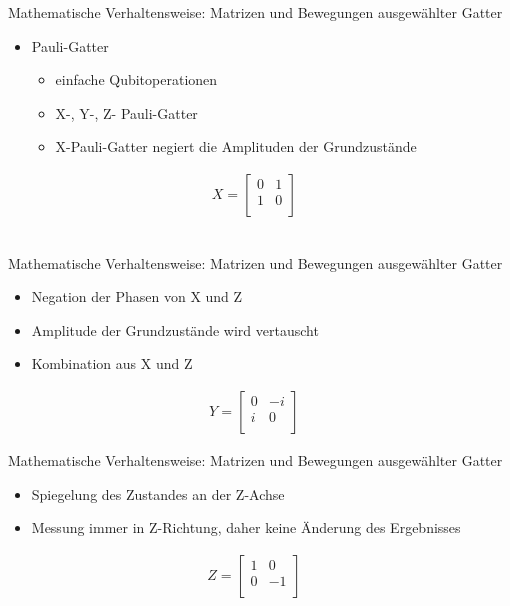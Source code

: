 \documentclass[]{beamer}
\begin{document}
\begin{frame}{Mathematische Verhaltensweise: Matrizen und Bewegungen ausgewählter Gatter}
\begin{center}%
	\begin{itemize}
	\item Pauli-Gatter \begin{itemize}
    \item einfache Qubitoperationen
    \item X-, Y-, Z- Pauli-Gatter
    \item X-Pauli-Gatter negiert die Amplituden der Grundzustände
	\end{itemize}
	\end{itemize}
    \begin{align*}X= \begin{bmatrix} 0&1\\1&0\\\end{bmatrix} &\end{align*} \\
\end{center}
\end{frame}

\begin{frame}{Mathematische Verhaltensweise: Matrizen und Bewegungen ausgewählter Gatter}
\begin{center}
\begin{itemize}
\item Negation der Phasen von X und Z
\item Amplitude der Grundzustände wird vertauscht
\item Kombination aus X und Z
\end{itemize}
\begin{align*}Y= \begin{bmatrix} 0&-i\\i&0\\\end{bmatrix} &\end{align*}
\end{center}
\end{frame}

\begin{frame}{Mathematische Verhaltensweise: Matrizen und Bewegungen ausgewählter Gatter}
\begin{center}
\begin{itemize}
\item Spiegelung des Zustandes an der Z-Achse
\item Messung immer in Z-Richtung, daher keine Änderung des Ergebnisses
\end{itemize}
\begin{align*}Z= \begin{bmatrix} 1&0\\0&-1\\\end{bmatrix} &\end{align*}
\end{center}
\end{frame}
\end{document}
